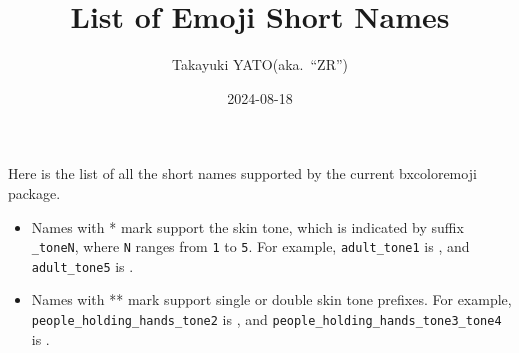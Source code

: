\documentclass[a4paper]{article}
\title{List of Emoji Short Names}
\author{Takayuki YATO\quad (aka.~``ZR'')}
\date{2024-08-18}
\begin{document}
\maketitle

Here is the list of all the short names supported by
the current bxcoloremoji package.
\begin{itemize}
\item Names with * mark support the skin tone,
  which is indicated by suffix \verb|_toneN|,
  where \texttt{N} ranges from \texttt{1} to \texttt{5}.
  For example,
  \verb|adult_tone1| is , and
  \verb|adult_tone5| is .
\item Names with ** mark support single or double skin tone prefixes.
  For example,
  \verb|people_holding_hands_tone2| is
  , and
  \verb|people_holding_hands_tone3_tone4| is
  .
\end{itemize}

\MakeShortVerb{\!}
\setlength{\tabcolsep}{1em}
\setlength{\arrayrulewidth}{1pt}
\newcommand*{\cHead}[2]{%
  \multicolumn{1}{c}{%
    \raisebox{0pt}[1.2em][0.5em]{\makebox[#1em][c]{%
      \small\bfseries\textcolor{myhead}{#2}}}}}
\newcommand*{\cCE}[1]{%
  \raisebox{-0.2em}[1.2em][0.6em]{%
    \scalebox{1.4}{\coloremojicode{:#1:}}}}
\newcommand*{\cCS}[1]{#1}
\end{document}
